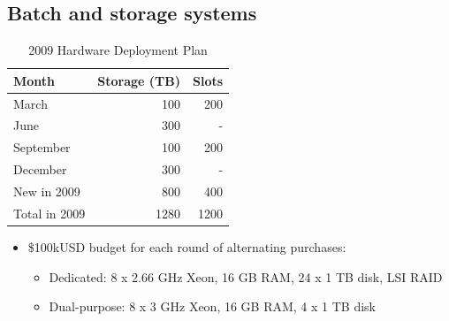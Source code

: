 \documentclass{beamer}
\begin{document}
\subsection{Batch and storage systems}
\begin{frame}
\begin{table}
\begin{tabular}{lrr}
    \toprule
    Month           &   Storage (TB)    &   Slots \\
    \midrule
    March           &   100             &   200 \\
    June            &   300             &   - \\
    September       &   100             &   200 \\
    December        &   300             &   - \\
    \midrule
    New in 2009     &   800             &   400 \\
    Total in 2009   &   1280            &   1200 \\
    \bottomrule
\end{tabular}
\caption{2009 Hardware Deployment Plan}
\label{2009_hardware deployment_plan}
\end{table}

\begin{itemize}
    \item \$100kUSD budget for each round of alternating purchases:
    \begin{itemize}
        \item Dedicated: 8 x 2.66 GHz Xeon, 16 GB RAM, 24 x 1 TB disk, LSI RAID
        \item Dual-purpose: 8 x 3 GHz Xeon, 16 GB RAM, 4 x 1 TB disk
    \end{itemize}
\end{itemize}

\end{frame}
\end{document}
